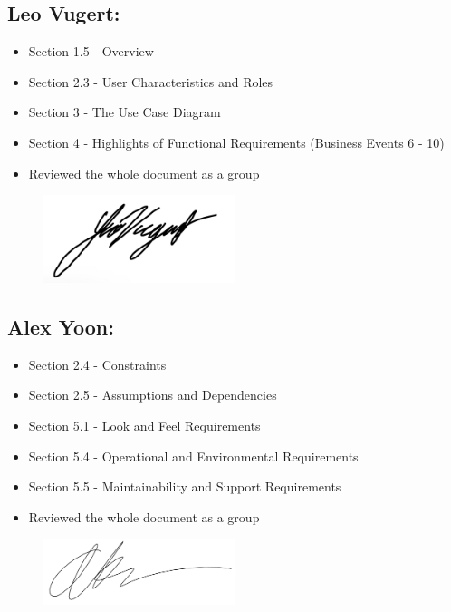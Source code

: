 \documentclass[]{article}
\begin{document}
\subsection*{Leo Vugert:}
\begin{itemize}
	\item Section 1.5 - Overview
	\item Section 2.3 - User Characteristics and Roles
	\item Section 3 - The Use Case Diagram
	\item Section 4 - Highlights of Functional Requirements (Business Events 6 - 10)
	\item Reviewed the whole document as a group
\end{itemize}
\begin{figure}[h]
	\centering
	\includegraphics[width=0.5\textwidth]{LeoSignature.jpg}
	\label{fig:signature}
\end{figure}

\subsection*{Alex Yoon:}
\begin{itemize}
	\item Section 2.4 - Constraints
	\item Section 2.5 - Assumptions and Dependencies
	\item Section 5.1 - Look and Feel Requirements
	\item Section 5.4 - Operational and Environmental Requirements
	\item Section 5.5 - Maintainability and Support Requirements
	\item Reviewed the whole document as a group
\end{itemize}
\begin{figure}[h]
	\centering
	\includegraphics[width=0.5\textwidth]{AlexSignature.png}
	\label{fig:signature}
\end{figure}
\end{document}

